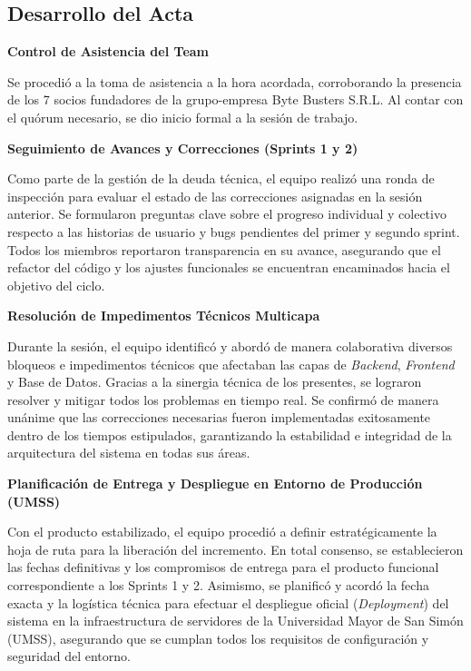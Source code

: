 \newpage
\subsection{Desarrollo del Acta}

\noindent \textbf{Control de Asistencia del Team}\par
Se procedió a la toma de asistencia a la hora acordada, corroborando la presencia de los 7 socios fundadores de la grupo-empresa Byte Busters S.R.L. Al contar con el quórum necesario, se dio inicio formal a la sesión de trabajo.

\vspace*{0.5cm}
\noindent \textbf{Seguimiento de Avances y Correcciones (Sprints 1 y 2)}\par
Como parte de la gestión de la deuda técnica, el equipo realizó una ronda de inspección para evaluar el estado de las correcciones asignadas en la sesión anterior. Se formularon preguntas clave sobre el progreso individual y colectivo respecto a las historias de usuario y bugs pendientes del primer y segundo sprint. Todos los miembros reportaron transparencia en su avance, asegurando que el refactor del código y los ajustes funcionales se encuentran encaminados hacia el objetivo del ciclo.

\vspace*{0.5cm}
\noindent \textbf{Resolución de Impedimentos Técnicos Multicapa}\par
Durante la sesión, el equipo identificó y abordó de manera colaborativa diversos bloqueos e impedimentos técnicos que afectaban las capas de \textit{Backend}, \textit{Frontend} y Base de Datos. Gracias a la sinergia técnica de los presentes, se lograron resolver y mitigar todos los problemas en tiempo real. Se confirmó de manera unánime que las correcciones necesarias fueron implementadas exitosamente dentro de los tiempos estipulados, garantizando la estabilidad e integridad de la arquitectura del sistema en todas sus áreas.

\vspace*{0.5cm}
\noindent \textbf{Planificación de Entrega y Despliegue en Entorno de Producción (UMSS)}\par
Con el producto estabilizado, el equipo procedió a definir estratégicamente la hoja de ruta para la liberación del incremento. En total consenso, se establecieron las fechas definitivas y los compromisos de entrega para el producto funcional correspondiente a los Sprints 1 y 2. Asimismo, se planificó y acordó la fecha exacta y la logística técnica para efectuar el despliegue oficial (\textit{Deployment}) del sistema en la infraestructura de servidores de la Universidad Mayor de San Simón (UMSS), asegurando que se cumplan todos los requisitos de configuración y seguridad del entorno.

